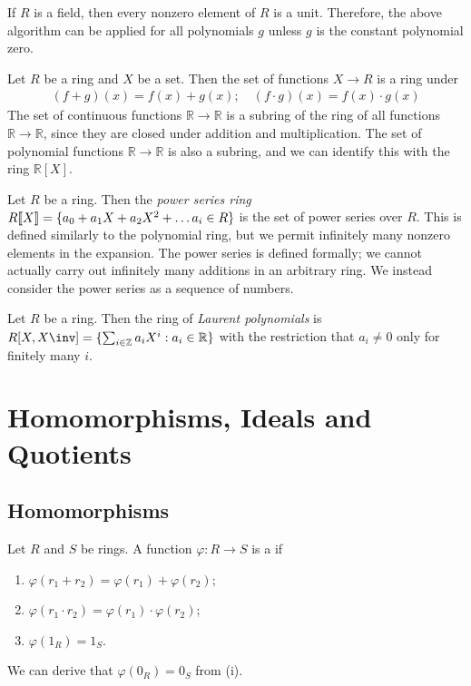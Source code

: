 \begin{remark}
	If $R$ is a field, then every nonzero element of $R$ is a unit.
	Therefore, the above algorithm can be applied for all polynomials $g$ unless $g$ is the constant polynomial zero.
\end{remark}

\begin{example}
	Let $R$ be a ring and $X$ be a set.
	Then the set of functions $X \to R$ is a ring under
	\begin{align*}
		(f + g)(x) = f(x) + g(x);\quad (f \cdot g)(x) = f(x) \cdot g(x)
	\end{align*}
	The set of continuous functions $\mathbb R \to \mathbb R$ is a subring of the ring of all functions $\mathbb R \to \mathbb R$, since they are closed under addition and multiplication.
	The set of polynomial functions $\mathbb R \to \mathbb R$ is also a subring, and we can identify this with the ring $\mathbb R[X]$.
\end{example}

\begin{example}
	Let $R$ be a ring.
	Then the \textit{power series ring} $R[\![X]\!] = \{a_0 + a_1X + a_2 X^2 + \dots a_i \in R\}$ is the set of power series over $R$.
	This is defined similarly to the polynomial ring, but we permit infinitely many nonzero elements in the expansion.
	The power series is defined formally; we cannot actually carry out infinitely many additions in an arbitrary ring.
	We instead consider the power series as a sequence of numbers.
\end{example}

\begin{example}
	Let $R$ be a ring.
	Then the ring of \textit{Laurent polynomials} is $R[X,X\inv] = \{\sum_{i \in \mathbb{Z}} a_i X^i : a_i \in \mathbb{R}\}$ with the restriction that $a_i \neq 0$ only for finitely many $i$.
\end{example}

\section{Homomorphisms, Ideals and Quotients}
\subsection{Homomorphisms}
\begin{definition}
	Let $R$ and $S$ be rings.
	A function $\varphi : R \to S$ is a  if
	\begin{enumerate}
		\item $\varphi(r_1 + r_2) = \varphi(r_1) + \varphi(r_2)$;
		\item $\varphi(r_1 \cdot r_2) = \varphi(r_1) \cdot \varphi(r_2)$;
		\item $\varphi(1_R) = 1_S$.
	\end{enumerate}
	We can derive that $\varphi(0_R) = 0_S$ from (i).
\end{definition}

